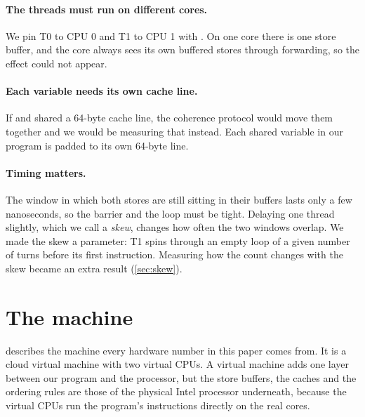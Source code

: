 \paragraph{The threads must run on different cores.} We pin T0 to CPU 0 and T1 to CPU 1 with . On one core there is one store buffer, and the core always sees its own buffered stores through forwarding, so the effect could not appear.

\paragraph{Each variable needs its own cache line.} If  and  shared a 64-byte cache line, the coherence protocol would move them together and we would be measuring that instead. Each shared variable in our program is padded to its own 64-byte line.

\paragraph{Timing matters.} The window in which both stores are still sitting in their buffers lasts only a few nanoseconds, so the barrier and the loop must be tight. Delaying one thread slightly, which we call a \emph{skew}, changes how often the two windows overlap. We made the skew a parameter: T1 spins through an empty loop of a given number of turns before its first instruction. Measuring how the count changes with the skew became an extra result (\cref{sec:skew}).

\section{The machine}
\label{sec:machine}

 describes the machine every hardware number in this paper comes from. It is a cloud virtual machine with two virtual CPUs. A virtual machine adds one layer between our program and the processor, but the store buffers, the caches and the ordering rules are those of the physical Intel processor underneath, because the virtual CPUs run the program's instructions directly on the real cores.

